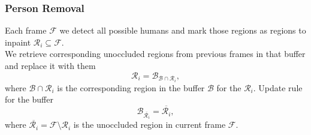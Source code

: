 \begin{frame}
  \frametitle{Person Removal}
  Each frame $\mathcal{F}$ we detect all possible humans
  and mark those regions as regions to inpaint
$\mathcal{R}_i \subseteq \mathcal{F}$.\\
We retrieve corresponding unoccluded regions from previous frames
in that buffer and replace it with them
\[
\mathcal{R}_i = \mathcal{B}_{\mathcal{B} \cap \mathcal{R}_i},
\]
where $\mathcal{B} \cap \mathcal{R}_i$ is the corresponding
region in the buffer $\mathcal{B}$ for the $\mathcal{R}_i$.
Update rule for the buffer
\[
\mathcal{B}_{\overline{\mathcal{R}_i}} = \overline{\mathcal{R}_i},
\]
where $\overline{\mathcal{R}_i} = \mathcal{F} \setminus \mathcal{R}_i$
is the unoccluded region in current frame $\mathcal{F}$.
\end{frame}
